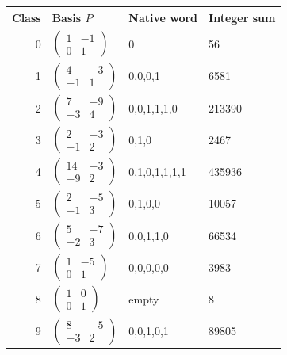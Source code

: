 \begin{center}
\small
\begin{longtable}{rlll}
Class & Basis $P$ & Native word & Integer sum\\\hline
0 & $\left(\begin{smallmatrix}1&-1\\0&1\end{smallmatrix}\right)$ & 0 & 56\\
1 & $\left(\begin{smallmatrix}4&-3\\-1&1\end{smallmatrix}\right)$ & 0,0,0,1 & 6581\\
2 & $\left(\begin{smallmatrix}7&-9\\-3&4\end{smallmatrix}\right)$ & 0,0,1,1,1,0 & 213390\\
3 & $\left(\begin{smallmatrix}2&-3\\-1&2\end{smallmatrix}\right)$ & 0,1,0 & 2467\\
4 & $\left(\begin{smallmatrix}14&-3\\-9&2\end{smallmatrix}\right)$ & 0,1,0,1,1,1,1 & 435936\\
5 & $\left(\begin{smallmatrix}2&-5\\-1&3\end{smallmatrix}\right)$ & 0,1,0,0 & 10057\\
6 & $\left(\begin{smallmatrix}5&-7\\-2&3\end{smallmatrix}\right)$ & 0,0,1,1,0 & 66534\\
7 & $\left(\begin{smallmatrix}1&-5\\0&1\end{smallmatrix}\right)$ & 0,0,0,0,0 & 3983\\
8 & $\left(\begin{smallmatrix}1&0\\0&1\end{smallmatrix}\right)$ & empty & 8\\
9 & $\left(\begin{smallmatrix}8&-5\\-3&2\end{smallmatrix}\right)$ & 0,0,1,0,1 & 89805\\

\end{longtable}
\end{center}

